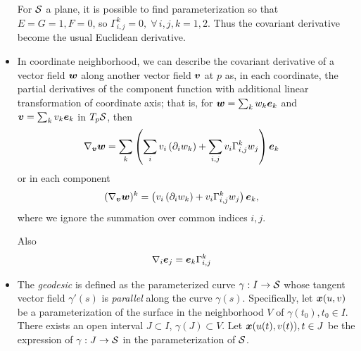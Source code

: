 \documentclass[11pt]{article}
\begin{document}
\begin{itemize}
For ${\mathcal S}$ a plane, it is possible to find parameterization so that $E=G=1, F=0$, so $\Gamma_{i,j}^{k} = 0, \;\forall \,i,j,k=1,2$. Thus the covariant derivative become the usual Euclidean derivative. \\


\item In coordinate neighborhood, we can describe the covariant derivative of a vector field $\boldsymbol{w}$ along another vector field $\boldsymbol{v}$ at $p$ as, in each coordinate, the partial derivatives of the component function with additional linear transformation of coordinate axis; that is, for $\boldsymbol{w} = \sum_{k}w_{k}\boldsymbol{e}_{k}$ and $\boldsymbol{v} = \sum_{k}v_{k}\boldsymbol{e}_{k}$ in $T_{p}{\mathcal S}$, then 
\begin{align*}
\nabla_{\boldsymbol{v}}\boldsymbol{w} &=\sum_{k} \left( \sum_{i}v_{i}\left(\partial_{i}w_{k}\right) + \sum_{i,j}v_{i}\Gamma_{i,j}^{k}w_{j} \right)\boldsymbol{e}_{k}
\end{align*}
or in each component 
\begin{align*}
(\nabla_{\boldsymbol{v}}\boldsymbol{w})^{k} &= \left(v_{i}\left(\partial_{i}w_{k}\right) + v_{i}\Gamma_{i,j}^{k}w_{j} \right)\boldsymbol{e}_{k},
\end{align*}
where we ignore the summation over common indices $i,j$.

Also \begin{align*}
\nabla_{i}\boldsymbol{e}_{j}&= \boldsymbol{e}_{k}\Gamma_{i,j}^{k}
\end{align*}



\item The \emph{geodesic} is defined as the parameterized curve $\gamma: I \rightarrow {\mathcal S}$ whose tangent vector field $\gamma'(s)$ is \emph{parallel} along the curve $\gamma(s)$.  Specifically, let $\boldsymbol{x}(u,v)$ be a parameterization of the surface in the neighborhood $V$ of $\gamma(t_{0}), t_{0}\in I$. There exists an open interval $J \subset I$, $\gamma(J) \subset V$. Let $\boldsymbol{x}(u(t), v(t)), t\in J$ be the expression of $\gamma: J  \rightarrow {\mathcal S}$ in the parameterization of ${\mathcal S}$. 


\end{itemize}
\end{document}
